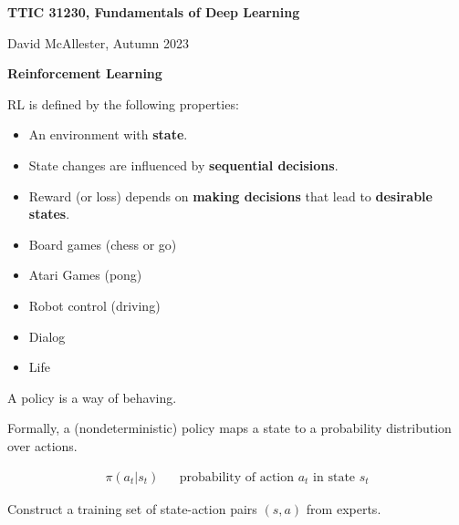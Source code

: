 




{\Huge

  \centerline{\bf TTIC 31230, Fundamentals of Deep Learning}
  \bigskip
  \centerline{David McAllester, Autumn 2023}
\vfill
  \centerline{\bf Reinforcement Learning}
  \vfill
\vfill


RL is defined by the following properties:

\vfill
\begin{itemize}
\item An environment with {\bf state}.

  \vfill
\item State changes are influenced by {\bf sequential decisions}.

  \vfill
\item  Reward (or loss) depends on {\bf making decisions} that lead to {\bf desirable states}.
\end{itemize}


\begin{itemize}
\item Board games (chess or go)

  \vfill
\item Atari Games (pong)

  \vfill
\item Robot control (driving)

  \vfill
\item Dialog

  \vfill
\item Life

\end{itemize}


A policy is a way of behaving.

\vfill
Formally, a (nondeterministic) policy maps a state to a probability distribution over actions.

\vfill
\begin{eqnarray*}
    \pi(a_t|s_t) & & \mbox{probability of action $a_t$ in state $s_t$}
\end{eqnarray*}


Construct a training set of state-action pairs $(s,a)$ from experts.

}
